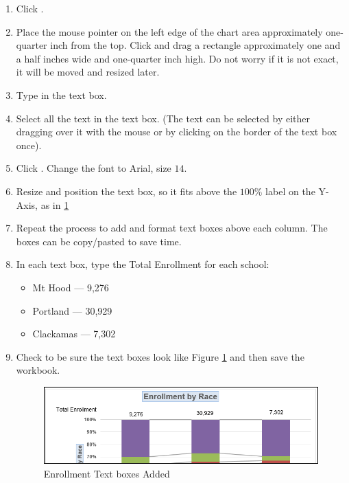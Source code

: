 \begin{enumbox}
	\begin{enumerate}
		\item Click .
		\item Place the mouse pointer on the left edge of the chart area approximately one-quarter inch from the top. Click and drag a rectangle approximately one and a half inches wide and one-quarter inch high. Do not worry if it is not exact, it will be moved and resized later.
		\item Type  in the text box.
		\item Select all the text in the text box. (The text can be selected by either dragging over it with the mouse or by clicking on the border of the text box once). 
		\item Click . Change the font to Arial, size $ 14 $.
		\item Resize and position the text box, so it fits above the $ 100\% $ label on the Y-Axis, as in \ref{04:fig43}
		\item Repeat the process to add and format text boxes above each column. The boxes can be copy/pasted to save time.
		\item In each text box, type the Total Enrollment for each school:
	
		\begin{itemize}
			\item Mt Hood --- 9,276
			\item Portland --- 30,929
			\item Clackamas --- 7,302
		\end{itemize}
		\item Check to be sure the text boxes look like Figure \ref{04:fig43} and then save the  workbook.
	
		\begin{figure}[H]
			\centering
			\includegraphics[width=\maxwidth{.95\linewidth}]{gfx/ch04_fig43}
			\caption{Enrollment Text boxes Added}
			\label{04:fig43}
		\end{figure}
	

\end{enumerate}
\end{enumbox}
